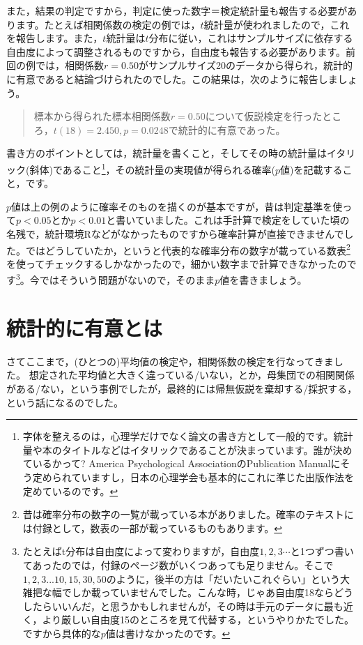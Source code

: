 \documentclass{ltjsbook}
\begin{document}
また，結果の判定ですから，判定に使った数字＝検定統計量も報告する必要があります。たとえば相関係数の検定の例では，$t$統計量が使われましたので，これを報告します。また，$t$統計量は$t$分布に従い，これはサンプルサイズに依存する自由度によって調整されるものですから，自由度も報告する必要があります。前回の例では，相関係数$r=0.50$がサンプルサイズ20のデータから得られ，統計的に有意であると結論づけられたのでした。この結果は，次のように報告しましょう。
\begin{quote}
	標本から得られた標本相関係数$r=0.50$について仮説検定を行ったところ，$t(18)=2.450,p=0.0248$で統計的に有意であった。
\end{quote}
書き方のポイントとしては，統計量を書くこと，そしてその時の統計量はイタリック(斜体)であること\footnote{字体を整えるのは，心理学だけでなく論文の書き方として一般的です。統計量や本のタイトルなどはイタリックであることが決まっています。誰が決めているかって? America Psychological AssociationのPublication Manualにそう定められていますし，日本の心理学会も基本的にこれに準じた出版作法を定めているのです。}，その統計量の実現値が得られる確率($p$値)を記載すること，です。

$p$値は上の例のように確率そのものを描くのが基本ですが，昔は判定基準を使って$p<0.05$とか$p<0.01$と書いていました。これは手計算で検定をしていた頃の名残で，統計環境Rなどがなかったものですから確率計算が直接できませんでした。ではどうしていたか，というと代表的な確率分布の数字が載っている数表\footnote{昔は確率分布の数字の一覧が載っている本がありました。確率のテキストには付録として，数表の一部が載っているものもあります。}を使ってチェックするしかなかったので，細かい数字まで計算できなかったのです\footnote{たとえばt分布は自由度によって変わりますが，自由度$1,2,3\cdots$と1つずつ書いてあったのでは，付録のページ数がいくつあっても足りません。そこで$1,2,3...10,15,30,50$のように，後半の方は「だいたいこれぐらい」という大雑把な幅でしか載っていませんでした。こんな時，じゃあ自由度18ならどうしたらいいんだ，と思うかもしれませんが，その時は手元のデータに最も近く，より厳しい自由度15のところを見て代替する，というやりかたでした。ですから具体的な$p$値は書けなかったのです。}。今ではそういう問題がないので，そのまま$p$値を書きましょう。

\section{統計的に有意とは}
\label{statistical_significant}
さてここまで，(ひとつの)平均値の検定や，相関係数の検定を行なってきました。
想定された平均値と大きく違っている/いない，とか，母集団での相関関係がある/ない，という事例でしたが，最終的には帰無仮説を棄却する/採択する，という話になるのでした。
\end{document}

